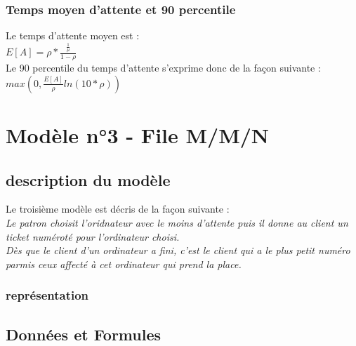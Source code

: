 \documentclass[a4paper,11pt]{article}
\begin{document}
		\subsubsection{Temps moyen d'attente et 90 percentile}
		Le temps d'attente moyen est :\\
		$E[A] = \rho * \frac{\frac{1}{\mu}}{1-\rho}$
		\\
		Le 90 percentile du temps d'attente s'exprime donc de la façon suivante :\\
		$max(0,\frac{E[A]}{\rho}ln(10*\rho))$
		

\section{Modèle n°3 - File M/M/N}
	\subsection{description du modèle}
	Le troisième modèle est décris de la façon suivante :\\
	\textit{Le patron choisit l'oridnateur avec le moins d'attente puis il donne au client un ticket numéroté pour l'ordinateur choisi.\\
			Dès que le client d'un ordinateur a fini, c'est le client qui a le plus petit numéro parmis ceux affecté à cet ordinateur qui prend la place.}
	\subsubsection{représentation}
	
	\subsection{Données et Formules}
	
\end{document}
